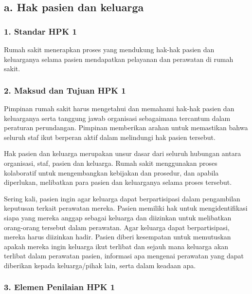 \documentclass[
]{book}
\begin{document}
\hypertarget{a.-hak-pasien-dan-keluarga}{%
\subsection*{a. Hak pasien dan keluarga}\label{a.-hak-pasien-dan-keluarga}}

\hypertarget{standar-hpk-1}{%
\subsubsection*{1. Standar HPK 1}\label{standar-hpk-1}}

Rumah sakit menerapkan proses yang mendukung hak-hak pasien dan keluarganya selama pasien mendapatkan pelayanan dan perawatan di rumah sakit.

\hypertarget{maksud-dan-tujuan-hpk-1}{%
\subsubsection*{2. Maksud dan Tujuan HPK 1}\label{maksud-dan-tujuan-hpk-1}}

Pimpinan rumah sakit harus mengetahui dan memahami hak-hak pasien dan keluarganya serta tanggung jawab organisasi sebagaimana tercantum dalam peraturan perundangan. Pimpinan memberikan arahan untuk memastikan bahwa seluruh staf ikut berperan aktif dalam melindungi hak pasien tersebut.

Hak pasien dan keluarga merupakan unsur dasar dari seluruh hubungan antara organisasi, staf, pasien dan keluarga. Rumah sakit menggunakan proses kolaboratif untuk mengembangkan kebijakan dan prosedur, dan apabila diperlukan, melibatkan para pasien dan keluarganya selama proses tersebut.

Sering kali, pasien ingin agar keluarga dapat berpartisipasi dalam pengambilan keputusan terkait perawatan mereka. Pasien memiliki hak untuk mengidentifikasi siapa yang mereka anggap sebagai keluarga dan diizinkan untuk melibatkan orang-orang tersebut dalam perawatan. Agar keluarga dapat berpartisipasi, mereka harus diizinkan hadir. Pasien diberi kesempatan untuk memutuskan apakah mereka ingin keluarga ikut terlibat dan sejauh mana keluarga akan terlibat dalam perawatan pasien, informasi apa mengenai perawatan yang dapat diberikan kepada keluarga/pihak lain, serta dalam keadaan apa.

\hypertarget{elemen-penilaian-hpk-1}{%
\subsubsection*{3. Elemen Penilaian HPK 1}\label{elemen-penilaian-hpk-1}}
\end{document}

